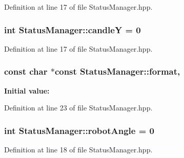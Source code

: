 Definition at line 17 of file Status\-Manager.\-hpp.

\hypertarget{classStatusManager_ac5a5ebf9f76a5ae36536be7fb2ce5383}{
\subsubsection[{candle\-Y}]{\setlength{\rightskip}{0pt plus 5cm}int Status\-Manager\-::candle\-Y = 0\hspace{0.3cm}{\ttfamily [static]}}}\label{classStatusManager_ac5a5ebf9f76a5ae36536be7fb2ce5383}


Definition at line 17 of file Status\-Manager.\-hpp.

\hypertarget{classStatusManager_a98bdd9d3e963455b576ff9a9bc5482ca}{
\subsubsection[{format}]{\setlength{\rightskip}{0pt plus 5cm}const char $\ast$const Status\-Manager\-::format\hspace{0.3cm}{\ttfamily [static]}, {\ttfamily [private]}}}\label{classStatusManager_a98bdd9d3e963455b576ff9a9bc5482ca}
{\bfseries Initial value\-:}


Definition at line 23 of file Status\-Manager.\-hpp.

\hypertarget{classStatusManager_af55087be7ac997b2db4258b26c285f1d}{
\subsubsection[{robot\-Angle}]{\setlength{\rightskip}{0pt plus 5cm}int Status\-Manager\-::robot\-Angle = 0\hspace{0.3cm}{\ttfamily [static]}}}\label{classStatusManager_af55087be7ac997b2db4258b26c285f1d}


Definition at line 18 of file Status\-Manager.\-hpp.

